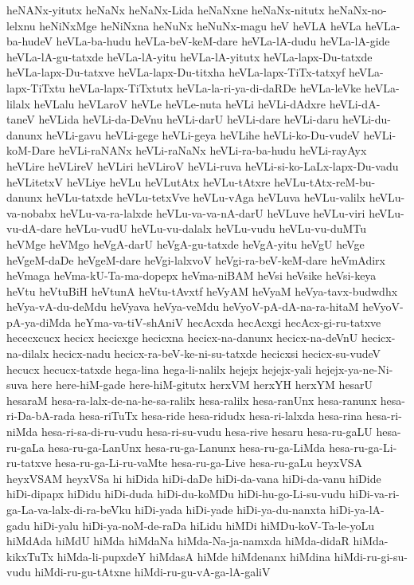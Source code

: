 {heNANx-yitutx
heNaNx
heNaNx-Lida
heNaNxne
heNaNx-nitutx
heNaNx-no-lelxnu
heNiNxMge
heNiNxna
heNuNx
heNuNx-magu
heV
heVLA
heVLa
heVLa-ba-hudeV
heVLa-ba-hudu
heVLa-beV-keM-dare
heVLa-lA-dudu
heVLa-lA-gide
heVLa-lA-gu-tatxde
heVLa-lA-yitu
heVLa-lA-yitutx
heVLa-lapx-Du-tatxde
heVLa-lapx-Du-tatxve
heVLa-lapx-Du-titxha
heVLa-lapx-TiTx-tatxyf
heVLa-lapx-TiTxtu
heVLa-lapx-TiTxtutx
heVLa-la-ri-ya-di-daRDe
heVLa-leVke
heVLa-lilalx
heVLalu
heVLaroV
heVLe
heVLe-nuta
heVLi
heVLi-dAdxre
heVLi-dA-taneV
heVLida
heVLi-da-DeVnu
heVLi-darU
heVLi-dare
heVLi-daru
heVLi-du-danunx
heVLi-gavu
heVLi-gege
heVLi-geya
heVLihe
heVLi-ko-Du-vudeV
heVLi-koM-Dare
heVLi-raNANx
heVLi-raNaNx
heVLi-ra-ba-hudu
heVLi-rayAyx
heVLire
heVLireV
heVLiri
heVLiroV
heVLi-ruva
heVLi-si-ko-LaLx-lapx-Du-vadu
heVLitetxV
heVLiye
heVLu
heVLutAtx
heVLu-tAtxre
heVLu-tAtx-reM-bu-danunx
heVLu-tatxde
heVLu-tetxVve
heVLu-vAga
heVLuva
heVLu-valilx
heVLu-va-nobabx
heVLu-va-ra-lalxde
heVLu-va-va-nA-darU
heVLuve
heVLu-viri
heVLu-vu-dA-dare
heVLu-vudU
heVLu-vu-dalalx
heVLu-vudu
heVLu-vu-duMTu
heVMge
heVMgo
heVgA-darU
heVgA-gu-tatxde
heVgA-yitu
heVgU
heVge
heVgeM-daDe
heVgeM-dare
heVgi-lalxvoV
heVgi-ra-beV-keM-dare
heVmAdirx
heVmaga
heVma-kU-Ta-ma-dopepx
heVma-niBAM
heVsi
heVsike
heVsi-keya
heVtu
heVtuBiH
heVtunA
heVtu-tAvxtf
heVyAM
heVyaM
heVya-tavx-budwdhx
heVya-vA-du-deMdu
heVyava
heVya-veMdu
heVyoV-pA-dA-na-ra-hitaM
heVyoV-pA-ya-diMda
heYma-va-tiV-shAniV
hecAcxda
hecAcxgi
hecAcx-gi-ru-tatxve
hececxcucx
hecicx
hecicxge
hecicxna
hecicx-na-danunx
hecicx-na-deVnU
hecicx-na-dilalx
hecicx-nadu
hecicx-ra-beV-ke-ni-su-tatxde
hecicxsi
hecicx-su-vudeV
hecucx
hecucx-tatxde
hega-lina
hega-li-nalilx
hejejx
hejejx-yali
hejejx-ya-ne-Ni-suva
here
here-hiM-gade
here-hiM-gitutx
herxVM
herxYH
herxYM
hesarU
hesaraM
hesa-ra-lalx-de-na-he-sa-ralilx
hesa-ralilx
hesa-ranUnx
hesa-ranunx
hesa-ri-Da-bA-rada
hesa-riTuTx
hesa-ride
hesa-ridudx
hesa-ri-lalxda
hesa-rina
hesa-ri-niMda
hesa-ri-sa-di-ru-vudu
hesa-ri-su-vudu
hesa-rive
hesaru
hesa-ru-gaLU
hesa-ru-gaLa
hesa-ru-ga-LanUnx
hesa-ru-ga-Lanunx
hesa-ru-ga-LiMda
hesa-ru-ga-Li-ru-tatxve
hesa-ru-ga-Li-ru-vaMte
hesa-ru-ga-Live
hesa-ru-gaLu
heyxVSA
heyxVSAM
heyxVSa
hi
hiDida
hiDi-daDe
hiDi-da-vana
hiDi-da-vanu
hiDide
hiDi-dipapx
hiDidu
hiDi-duda
hiDi-du-koMDu
hiDi-hu-go-Li-su-vudu
hiDi-va-ri-ga-La-va-lalx-di-ra-beVku
hiDi-yada
hiDi-yade
hiDi-ya-du-nanxta
hiDi-ya-lA-gadu
hiDi-yalu
hiDi-ya-noM-de-raDa
hiLidu
hiMDi
hiMDu-koV-Ta-le-yoLu
hiMdAda
hiMdU
hiMda
hiMdaNa
hiMda-Na-ja-namxda
hiMda-didaR
hiMda-kikxTuTx
hiMda-li-pupxdeY
hiMdasA
hiMde
hiMdenanx
hiMdina
hiMdi-ru-gi-su-vudu
hiMdi-ru-gu-tAtxne
hiMdi-ru-gu-vA-ga-lA-galiV
}
